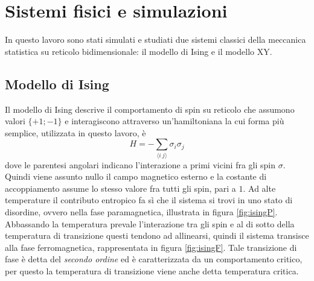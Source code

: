 \documentclass{article}
\begin{document}

\section{Sistemi fisici e simulazioni}
In questo lavoro sono stati simulati e studiati due sistemi classici della meccanica statistica su reticolo bidimensionale:  il modello di Ising e il modello XY.

\subsection{Modello di Ising}\label{sec:simIsing}
Il modello di Ising descrive il comportamento di spin su reticolo che assumono valori $\{+1;-1\}$ e interagiscono attraverso un'hamiltoniana la cui forma più semplice, utilizzata in questo lavoro, è
\begin{equation}
H=- \sum_{\langle i~j\rangle} \sigma_i\sigma_j
\end{equation}
dove le parentesi angolari indicano l'interazione a primi vicini fra gli spin $\sigma$.
Quindi viene assunto nullo il campo magnetico esterno e la costante di accoppiamento assume lo stesso valore fra tutti gli spin, pari a $1$.
Ad alte temperature il contributo entropico fa sì che il sistema si trovi in uno stato di disordine, ovvero nella fase paramagnetica, illustrata in figura \ref{fig:isingP}.
Abbassando la temperatura prevale l'interazione tra gli spin e al di sotto della temperatura di transizione questi tendono ad allinearsi, quindi il sistema transisce alla fase ferromagnetica, rappresentata in figura \ref{fig:isingF}.
Tale transizione di fase è detta del \emph{secondo ordine} ed è caratterizzata da un comportamento critico, per questo la temperatura di transizione viene anche detta temperatura critica.
\end{document}
